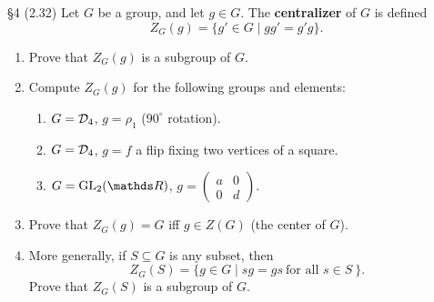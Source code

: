 \documentclass{homework}
\begin{document}
\begin{problem}{\S 4}
  (2.32) Let $G$ be a group, and let $g\in G$. The \textbf{centralizer} of $G$ is defined \[
    Z_G(g) = \{ g'\in G \mid gg'=g'g \}
  .\] 
  \begin{enumerate}[label=(\alph*)]
    \item Prove that $Z_G(g)$ is a subgroup of $G$.
    \item Compute $Z_G(g)$ for the following groups and elements:
      \begin{enumerate}
        \item $G=\mathcal{D}_4$, $g=\rho_1$ ($90^{\circ}$ rotation).
        \item $G=\mathcal{D}_4$, $g=f$ a flip fixing two vertices of a square.
        \item $G=\GL_2(\R)$, $g=\begin{pmatrix} a&0\\0&d \end{pmatrix} $.
      \end{enumerate}
    \item Prove that $Z_G(g) = G$ iff $g\in Z(G)$ (the center of $G$).
    \item More generally, if $S\subseteq G$ is any subset, then \[
      Z_G(S) = \{g\in G\mid sg=gs ~\text{for all $s \in S$}~\} 
    .\] Prove that $Z_G(S)$ is a subgroup of $G$.
  \end{enumerate}
\end{problem}
\end{document}
